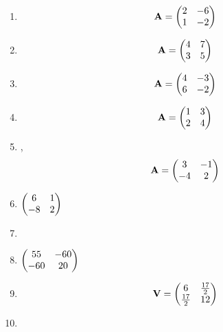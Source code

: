 \documentclass[journal,12pt,twocolumn]{IEEEtran}
\renewcommand\thesection{\arabic{section}}
\begin{document}
\begin{enumerate}[label=\thesection.\arabic*.,ref=\thesection.\theenumi]
%
\item 
\begin{align}
\mathbf{A} = \begin{pmatrix} 2&-6\\1&-2\end{pmatrix}
\label{eq:solutions/decomp/2/26/Q}
\end{align}
%
%
\item 
\begin{align} 
    \mathbf{A} = \begin{pmatrix} 4 & 7 \\ 3 & 5\end{pmatrix}
\end{align}
%
%
\item  
\begin{align}
\mathbf{A} = \begin{pmatrix} 4&-3\\6&-2\end{pmatrix}
\label{eq:solutions/decomp/2/28/Q}
\end{align}
%
%

%
\item   
\begin{align}
\mathbf{A}=\begin{pmatrix} 1&3\\2&4\end{pmatrix} \label{eq:solutions/decomp/2/31/eq:1}
\end{align}
%
%
%
\item  ,
\begin{align}
\mathbf{A} = \begin{pmatrix} 3&-1\\-4&2\end{pmatrix}
\label{eq:solutions/decomp/2/32/eq:p0}
\end{align}
%
%
\item   $\begin{pmatrix} 6&1\\-8&2\end{pmatrix}$
%
\item   {}
%
%
%
\item   $\begin{pmatrix} 55 & -60\\-60 & 20\end{pmatrix}$

%
%
\item 
\begin{equation}
	\mathbf{V} = \begin{pmatrix} 6 & \frac{17}{2}\\ \frac{17}{2} & 12\end{pmatrix}
\end{equation}
%
%
%
\item 
  

\end{enumerate}
\end{document}
